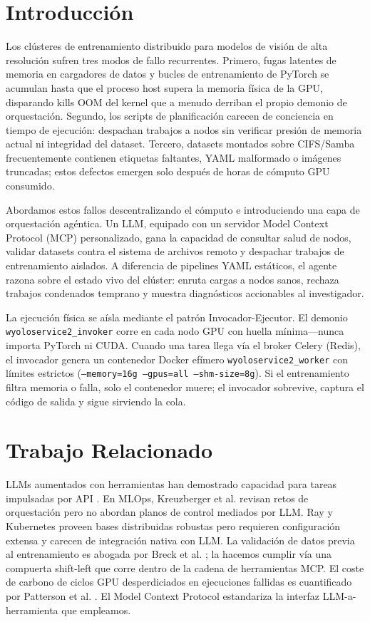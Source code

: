 \documentclass[10pt,twocolumn,letterpaper]{article}
\begin{document}
\section{Introducción}
Los clústeres de entrenamiento distribuido para modelos de visión de alta resolución sufren tres modos de fallo recurrentes. Primero, fugas latentes de memoria en cargadores de datos y bucles de entrenamiento de PyTorch se acumulan hasta que el proceso host supera la memoria física de la GPU, disparando kills OOM del kernel que a menudo derriban el propio demonio de orquestación. Segundo, los scripts de planificación carecen de conciencia en tiempo de ejecución: despachan trabajos a nodos sin verificar presión de memoria actual ni integridad del dataset. Tercero, datasets montados sobre CIFS/Samba frecuentemente contienen etiquetas faltantes, YAML malformado o imágenes truncadas; estos defectos emergen solo después de horas de cómputo GPU consumido.

Abordamos estos fallos descentralizando el cómputo e introduciendo una capa de orquestación agéntica. Un LLM, equipado con un servidor Model Context Protocol (MCP) personalizado, gana la capacidad de consultar salud de nodos, validar datasets contra el sistema de archivos remoto y despachar trabajos de entrenamiento aislados. A diferencia de pipelines YAML estáticos, el agente razona sobre el estado vivo del clúster: enruta cargas a nodos sanos, rechaza trabajos condenados temprano y muestra diagnósticos accionables al investigador.

La ejecución física se aísla mediante el patrón Invocador-Ejecutor. El demonio \texttt{wyoloservice2\_invoker} corre en cada nodo GPU con huella mínima---nunca importa PyTorch ni CUDA. Cuando una tarea llega vía el broker Celery (Redis), el invocador genera un contenedor Docker efímero \texttt{wyoloservice2\_worker} con límites estrictos (\texttt{--memory=16g --gpus=all --shm-size=8g}). Si el entrenamiento filtra memoria o falla, solo el contenedor muere; el invocador sobrevive, captura el código de salida y sigue sirviendo la cola.

\section{Trabajo Relacionado}
LLMs aumentados con herramientas han demostrado capacidad para tareas impulsadas por API \cite{schick2023toolformer}. En MLOps, Kreuzberger et al. \cite{kreuzberger2023mlops} revisan retos de orquestación pero no abordan planos de control mediados por LLM. Ray \cite{moritz2018ray} y Kubernetes \cite{burns2016borg} proveen bases distribuidas robustas pero requieren configuración extensa y carecen de integración nativa con LLM. La validación de datos previa al entrenamiento es abogada por Breck et al. \cite{breck2019data}; la hacemos cumplir vía una compuerta shift-left que corre dentro de la cadena de herramientas MCP. El coste de carbono de ciclos GPU desperdiciados en ejecuciones fallidas es cuantificado por Patterson et al. \cite{patterson2021carbon}. El Model Context Protocol \cite{anthropic2024mcp} estandariza la interfaz LLM-a-herramienta que empleamos.
\end{document}
